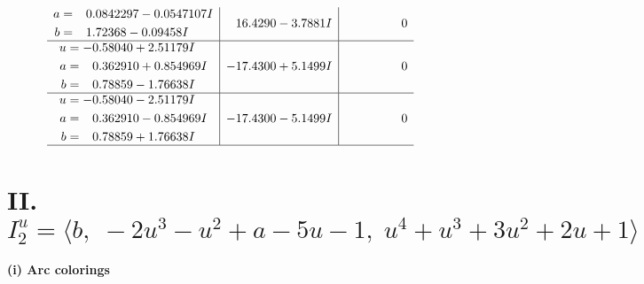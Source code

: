\documentclass[1p]{elsarticle_modified}
\theoremstyle{definition}
\begin{document}
$$\begin{array}{c|c|c}
\begin{aligned}
a &= \phantom{-}0.0842297 - 0.0547107 I \\
b &= \phantom{-}1.72368 - 0.09458 I\end{aligned}
 & \phantom{-}16.4290 - 3.7881 I & \phantom{-0.000000 } 0 \\ \hline\begin{aligned}
u &= -0.58040 + 2.51179 I \\
a &= \phantom{-}0.362910 + 0.854969 I \\
b &= \phantom{-}0.78859 - 1.76638 I\end{aligned}
 & -17.4300 + 5.1499 I & \phantom{-0.000000 } 0 \\ \hline\begin{aligned}
u &= -0.58040 - 2.51179 I \\
a &= \phantom{-}0.362910 - 0.854969 I \\
b &= \phantom{-}0.78859 + 1.76638 I\end{aligned}
 & -17.4300 - 5.1499 I & \phantom{-0.000000 } 0\\
 \hline 
 \end{array}$$\newpage\newpage\renewcommand{\arraystretch}{1}
\centering \section*{II. $I^u_{2}= \langle b,\;-2 u^3- u^2+a-5 u-1,\;u^4+u^3+3 u^2+2 u+1 \rangle$}
\flushleft \textbf{(i) Arc colorings}\\
\end{document}
